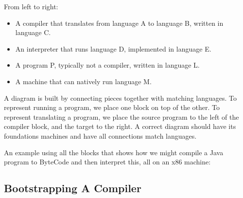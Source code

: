 \documentclass[12pt,a4paper,twoside,openright]{report}
\newcommand{\tblocktext}[3]{
    {#1} \& $\to$   \& {#2} \\
    {}     \&  {#3}   \&      \\
}
\newcommand{\tblockoutline}[1]{
    \draw (#1-1-1.south west) |- (#1-1-3.north east) |- (#1-1-3.south west) |- (#1-2-2.south west) |- (#1-1-1.south west);
}
\newcommand{\wblocktext}[1]{
    {#1} \\
    {}\\
}
\newcommand{\wblockoutline}[1]{
    \draw (#1-1-1.south west) |- (#1-1-1.north east) -- (#1-1-1.south east) -- (#1-2-1.south) -- (#1-1-1.south west);
}
\newcommand{\vblocktext}[2]{
    	{#1} 	\\
      			\\
	{#2}	\\
}
\newcommand{\vblockoutline}[1]{
	\draw (#1-1-1.north west) |- (#1-3-1.south east) |-  (#1-1-1.north west);
}
\newcommand{\pblocktext}[2]{
    	{#1} 	\\
	{#2}	\\
}
\newcommand{\pblockoutline}[1]{
	\draw (#1-1-1.north west) arc [radius=0.55, start angle=90, end angle = 270];
	\draw (#1-1-1.south east) arc [radius=0.55, start angle=270, end angle = 450];
	\draw (#1-1-1.north west) -- (#1-1-1.north east);
	\draw (#1-1-1.south east) |- (#1-2-1.south west)  |-  (#1-2-1.north west);
}
\newcommand{\wsupt}[2]{
	\node(mac#2) at (#2-2-2.south west) [wblock, anchor = mac#2-1-1.north west] {\wblocktext{#1}};
	\wblockoutline{mac#2};
}
\begin{document}
From left to right:

 \begin{itemize}
 	\item A compiler that translates from language A to language B, written in language C.
 	\item An interpreter that runs language D, implemented in language E.
 	\item A program P, typically not a compiler, written in language L.
 	\item A machine that can natively run language M.
\end{itemize}

A diagram is built by connecting pieces together with matching languages. To represent running a program, we place one block on top of the other. To represent translating a program, we place the source program to the left of the compiler block, and the target to the right. A correct diagram should have its foundations machines and have all connections match languages.

 \bigskip
 
An example using all the blocks that shows how we might compile a Java program to ByteCode and then interpret this, all on an x86 machine:

\begin{center}
\end{center}

\subsection{Bootstrapping A Compiler}
	
\end{document}
